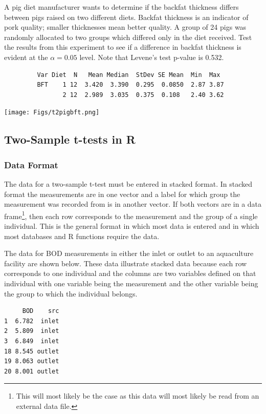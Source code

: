 \documentclass[10pt,openany]{book}\usepackage[]{graphicx}\usepackage[]{color}
\makeatletter
\newenvironment{kframe}{%
 \def\at@end@of@kframe{}%
 \ifinner\ifhmode%
  \def\at@end@of@kframe{\end{minipage}}%
  \begin{minipage}{\columnwidth}%
 \fi\fi%
 \def\FrameCommand##1{\hskip\@totalleftmargin \hskip-\fboxsep
 \colorbox{shadecolor}{##1}\hskip-\fboxsep
     \hskip-\linewidth \hskip-\@totalleftmargin \hskip\columnwidth}%
 \MakeFramed {\advance\hsize-\width
   \@totalleftmargin\z@ \linewidth\hsize
   \@setminipage}}%
 {\par\unskip\endMakeFramed%
 \at@end@of@kframe}
\newenvironment{knitrout}{}{} %
\makeatother
\begin{document}
\begin{exsection}
  \item \label{revex:tTestPigBFT} A pig diet manufacturer wants to determine if the backfat thickness differs between pigs raised on two different diets.  Backfat thickness is an indicator of pork quality; smaller thicknesses mean better quality.  A group of 24 pigs was randomly allocated to two groups which differed only in the diet received.  Test the results from this experiment to see if a difference in backfat thickness is evident at the $\alpha=0.05$ level.  Note that Levene's test p-value is 0.532. 
  \begin{Verbatim}
         Var Diet  N   Mean Median  StDev SE Mean  Min  Max
         BFT    1 12  3.420  3.390  0.295  0.0850  2.87 3.87
                2 12  2.989  3.035  0.375  0.108   2.40 3.62
  \end{Verbatim}
  \begin{center}
    \texttt{[image: Figs/t2pigbft.png]}
  \end{center}

\end{exsection}

\subsection{Two-Sample t-tests in R}
\subsubsection{Data Format}
The data for a two-sample t-test must be entered in stacked format.  In stacked format the measurements are in one vector and a label for which group the measurement was recorded from is in another vector.  If both vectors are in a data frame\footnote{This will most likely be the case as this data will most likely be read from an external data file.}, then each row corresponds to the measurement and the group of a single individual.  This is the general format in which most data is entered and in which most databases and R functions require the data.

The data for BOD measurements in either the inlet or outlet to an aquaculture facility are shown below.  These data illustrate stacked data because each row corresponds to one individual and the columns are two variables defined on that individual with one variable being the measurement and the other variable being the group to which the individual belongs.
\begin{knitrout}
\color{fgcolor}\begin{kframe}
\begin{verbatim}
     BOD    src
1  6.782  inlet
2  5.809  inlet
3  6.849  inlet
18 8.545 outlet
19 8.063 outlet
20 8.001 outlet
\end{verbatim}
\end{kframe}
\end{knitrout}
\end{document}
